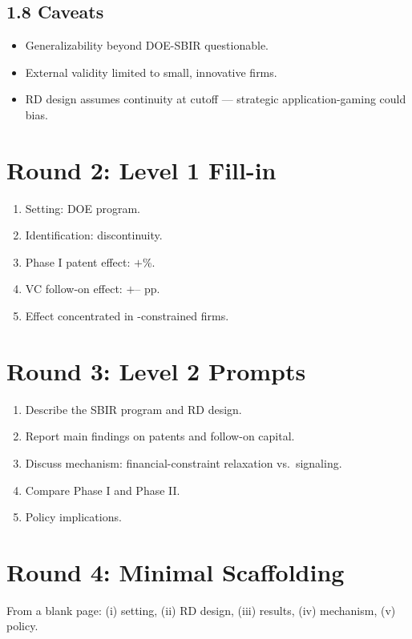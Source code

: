 \documentclass[11pt]{article}
\newcommand{\blank}[1]{\underline{\hspace{#1}}}
\begin{document}
\subsection*{1.8 Caveats}
\begin{alertbox}
\begin{itemize}
\item Generalizability beyond DOE-SBIR questionable.
\item External validity limited to small, innovative firms.
\item RD design assumes continuity at cutoff --- strategic application-gaming could bias.
\end{itemize}
\end{alertbox}

\section*{Round 2: Level 1 Fill-in}
\begin{enumerate}
\item Setting: DOE \blank{2cm} program.
\item Identification: \blank{2cm} discontinuity.
\item Phase I patent effect: $+$\blank{1cm}\%.
\item VC follow-on effect: $+$\blank{1cm}--\blank{1cm} pp.
\item Effect concentrated in \blank{2cm}-constrained firms.
\end{enumerate}

\section*{Round 3: Level 2 Prompts}
\begin{enumerate}
\item Describe the SBIR program and RD design.
\item Report main findings on patents and follow-on capital.
\item Discuss mechanism: financial-constraint relaxation vs.\ signaling.
\item Compare Phase I and Phase II.
\item Policy implications.
\end{enumerate}

\section*{Round 4: Minimal Scaffolding}
From a blank page: (i) setting, (ii) RD design, (iii) results, (iv) mechanism, (v) policy.
\end{document}

